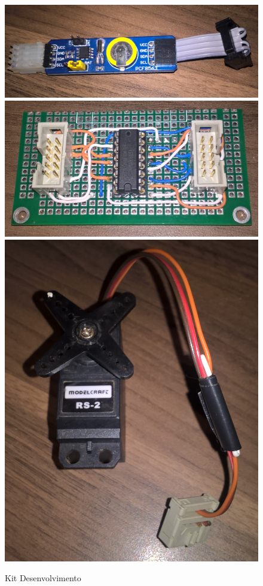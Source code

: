 \begin{figure}[H]
\begin{center}
\flushleft
\includegraphics[scale=0.1]{./image/img/RTC_1.jpg} \hspace{1.5cm}
\includegraphics[scale=0.1]{./image/img/HC595_2.jpg} \\
\vspace*{.5cm}
\includegraphics[scale=0.1]{./image/img/ServMot_1.jpg}
\caption{Kit Desenvolvimento}
\end{center}
\end{figure}


